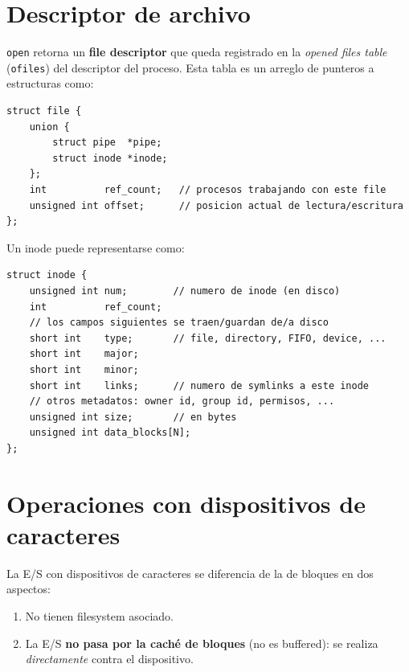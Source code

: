 \documentclass[11pt,a4paper]{article}
\begin{document}
\section{Descriptor de archivo}

\texttt{open} retorna un \textbf{file descriptor} que queda registrado
en la \emph{opened files table} (\verb|ofiles|) del descriptor del
proceso. Esta tabla es un arreglo de punteros a estructuras como:

\begin{lstlisting}[style=cstyle]
struct file {
    union {
        struct pipe  *pipe;
        struct inode *inode;
    };
    int          ref_count;   // procesos trabajando con este file
    unsigned int offset;      // posicion actual de lectura/escritura
};
\end{lstlisting}

Un inode puede representarse como:

\begin{lstlisting}[style=cstyle]
struct inode {
    unsigned int num;        // numero de inode (en disco)
    int          ref_count;
    // los campos siguientes se traen/guardan de/a disco
    short int    type;       // file, directory, FIFO, device, ...
    short int    major;
    short int    minor;
    short int    links;      // numero de symlinks a este inode
    // otros metadatos: owner id, group id, permisos, ...
    unsigned int size;       // en bytes
    unsigned int data_blocks[N];
};
\end{lstlisting}

\section{Operaciones con dispositivos de caracteres}

La E/S con dispositivos de caracteres se diferencia de la de bloques en
dos aspectos:

\begin{enumerate}[leftmargin=*,nosep]
    \item No tienen filesystem asociado.
    \item La E/S \textbf{no pasa por la caché de bloques} (no es
        buffered): se realiza \emph{directamente} contra el
        dispositivo.
\end{enumerate}
\end{document}
